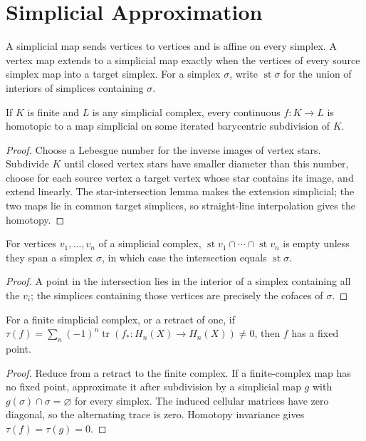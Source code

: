 \section{Simplicial Approximation}

A simplicial map sends vertices to vertices and is affine on every simplex.  A vertex map extends to a simplicial map exactly when the vertices of every source simplex map into a target simplex.  For a simplex $\sigma$, write $\operatorname{st}\sigma$ for the union of interiors of simplices containing $\sigma$.

\begin{theorem}
\label{thm:simplicial-approximation}
If $K$ is finite and $L$ is any simplicial complex, every continuous $f:K\to L$ is homotopic to a map simplicial on some iterated barycentric subdivision of $K$.
\end{theorem}
\begin{proof}
\sketch Choose a Lebesgue number for the inverse images of vertex stars.  Subdivide $K$ until closed vertex stars have smaller diameter than this number, choose for each source vertex a target vertex whose star contains its image, and extend linearly.  The star-intersection lemma makes the extension simplicial; the two maps lie in common target simplices, so straight-line interpolation gives the homotopy.
\end{proof}

\begin{lemma}
\label{lem:star-intersections}
For vertices $v_1,\ldots,v_n$ of a simplicial complex, $\operatorname{st}v_1\cap\cdots\cap\operatorname{st}v_n$ is empty unless they span a simplex $\sigma$, in which case the intersection equals $\operatorname{st}\sigma$.
\end{lemma}
\begin{proof}
\sketch A point in the intersection lies in the interior of a simplex containing all the $v_i$; the simplices containing those vertices are precisely the cofaces of $\sigma$.
\end{proof}

\begin{theorem}
\label{thm:lefschetz-fixed-point}
For a finite simplicial complex, or a retract of one, if $\tau(f)=\sum_n(-1)^n\operatorname{tr}(f_*:H_n(X)\to H_n(X))\ne0$, then $f$ has a fixed point.
\end{theorem}
\begin{proof}
\sketch Reduce from a retract to the finite complex.  If a finite-complex map has no fixed point, approximate it after subdivision by a simplicial map $g$ with $g(\sigma)\cap\sigma=\varnothing$ for every simplex.  The induced cellular matrices have zero diagonal, so the alternating trace is zero.  Homotopy invariance gives $\tau(f)=\tau(g)=0$.
\end{proof}

